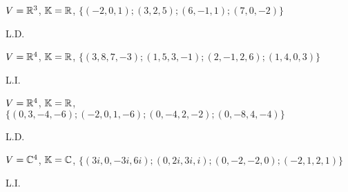 \documentclass[12pt]{exam}
\begin{document}
    \begin{exercicio}
        $V = \mathbb{R}^3$, $\mathbb{K} = \mathbb{R}$, $\{(-2, 0, 1); (3, 2, 5); (6, -1, 1); (7, 0, -2)\}$
        \begin{solucao}
            L.D.
        \end{solucao}
    \end{exercicio}

    \begin{exercicio}
        $V = \mathbb{R}^4$, $\mathbb{K} = \mathbb{R}$, $\{(3, 8, 7, -3); (1, 5, 3, -1); (2, -1, 2, 6); (1, 4, 0, 3)\}$
        \begin{solucao}
            L.I.
        \end{solucao}
    \end{exercicio}

    \begin{exercicio}
        $V = \mathbb{R}^4$, $\mathbb{K} = \mathbb{R}$, $\{(0, 3, -4, -6); (-2, 0, 1, -6); (0, -4, 2, -2); (0, -8, 4, -4)\}$
        \begin{solucao}
            L.D.
        \end{solucao}
    \end{exercicio}

    \begin{exercicio}\label{fimtesteldli}
        $V = \mathbb{C}^4$, $\mathbb{K} = \mathbb{C}$, $\{(3i, 0, -3i, 6i); (0, 2i, 3i, i); (0, -2, -2, 0); (-2, 1, 2, 1)\}$
        \begin{solucao}
            L.I.
        \end{solucao}
    \end{exercicio}
\end{document}

